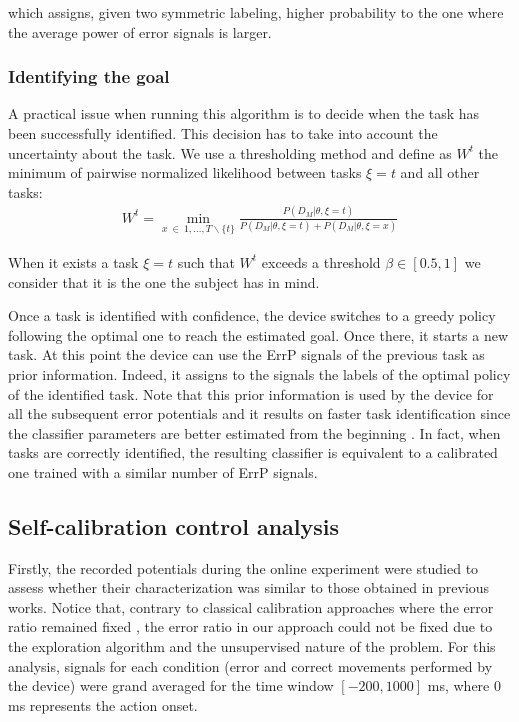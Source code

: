 \documentclass[10pt,letterpaper]{article}
\begin{document}
which assigns, given two symmetric labeling, higher probability to the one where the average power of error  signals is larger.  

\subsubsection{Identifying the goal}
\label{sec:confidence}
A practical issue when running this algorithm is to decide when the task has been successfully identified. This decision has to take into account the uncertainty about the task. We use a thresholding method and define as $W^{t}$ the minimum of pairwise normalized likelihood between tasks $\xi=t$ and all other tasks: 
%
\begin{eqnarray}
	W^{t} = \min_{x~\in~{1, \ldots, T} \smallsetminus \{t\}} \frac{P(D_M | \theta, \xi=t)}{P(D_M | \theta, \xi=t) + P(D_M | \theta, \xi=x)}
	\label{eq:weight}
\end{eqnarray}

When it exists a task $\xi=t$ such that $W^{t}$ exceeds a threshold $\beta \in [0.5,1]$ we consider that it is the one the subject has in mind.

Once a task is identified with confidence, the device switches to a greedy policy following the optimal one to reach the estimated goal. Once there, it starts a new task. At this point the device can use the ErrP signals of the previous task as prior information. Indeed, it assigns to the signals the labels of the optimal policy of the identified task.  Note that this prior information is used by the device for all the subsequent error potentials and it results on faster task identification since the classifier parameters are better estimated from the beginning \cite{grizou2014interactive}. In fact, when tasks are correctly identified, the resulting classifier is equivalent to a calibrated one trained with a similar number of ErrP signals. 

\subsection{Self-calibration control analysis}

Firstly, the recorded potentials during the online experiment were studied to assess whether their characterization was similar to those obtained in previous works. Notice that, contrary to classical calibration approaches where the error ratio remained fixed \cite{chavarriaga2010learning, iturrate13}, the error ratio in our approach could not be fixed due to the exploration algorithm and the unsupervised nature of the problem. For this analysis, signals for each condition (error and correct movements performed by the device) were grand averaged for the time window $[-200, 1000]$ ms, where 0 ms represents the action onset.
\end{document}
